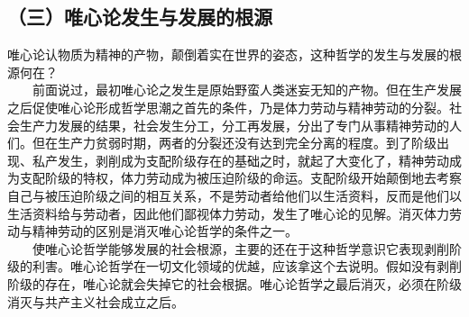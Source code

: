 \documentclass[cn,11pt,chinese]{elegantbook}
\def\myformat#1{\hfil\hfil #1}
\begin{document}
\subsection*{\myformat{（三）唯心论发生与发展的根源}}
唯心论认物质为精神的产物，颠倒着实在世界的姿态，这种哲学的发生与发展的根源何在？\\
　　前面说过，最初唯心论之发生是原始野蛮人类迷妄无知的产物。但在生产发展之后促使唯心论形成哲学思潮之首先的条件，乃是体力劳动与精神劳动的分裂。社会生产力发展的结果，社会发生分工，分工再发展，分出了专门从事精神劳动的人们。但在生产力贫弱时期，两者的分裂还没有达到完全分离的程度。到了阶级出现、私产发生，剥削成为支配阶级存在的基础之时，就起了大变化了，精神劳动成为支配阶级的特权，体力劳动成为被压迫阶级的命运。支配阶级开始颠倒地去考察自己与被压迫阶级之间的相互关系，不是劳动者给他们以生活资料，反而是他们以生活资料给与劳动者，因此他们鄙视体力劳动，发生了唯心论的见解。消灭体力劳动与精神劳动的区别是消灭唯心论哲学的条件之一。\\
　　使唯心论哲学能够发展的社会根源，主要的还在于这种哲学意识它表现剥削阶级的利害。唯心论哲学在一切文化领域的优越，应该拿这个去说明。假如没有剥削阶级的存在，唯心论就会失掉它的社会根据。唯心论哲学之最后消灭，必须在阶级消灭与共产主义社会成立之后。\\
\end{document}
